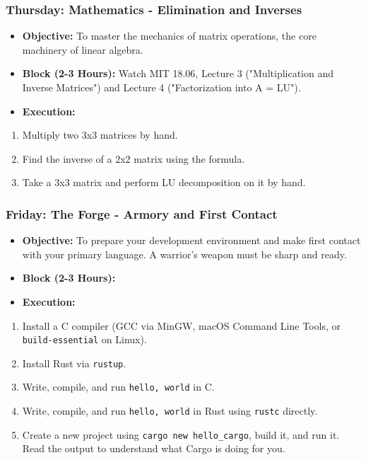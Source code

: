 \documentclass[11pt,a4paper]{report}
\begin{document}
\subsubsection{\textbf{Thursday: Mathematics - Elimination and Inverses}}
\begin{itemize}
  \item \textbf{Objective:} To master the mechanics of matrix operations, the core machinery of linear algebra.
  \item \textbf{Block (2-3 Hours):} Watch MIT 18.06, Lecture 3 ("Multiplication and Inverse Matrices") and Lecture 4 ("Factorization into A = LU").
  \item \textbf{Execution:}
\end{itemize}
\begin{enumerate}
  \item Multiply two 3x3 matrices by hand.
  \item Find the inverse of a 2x2 matrix using the formula.
  \item Take a 3x3 matrix and perform LU decomposition on it by hand.

\end{enumerate}
\subsubsection{\textbf{Friday: The Forge - Armory and First Contact}}
\begin{itemize}
  \item \textbf{Objective:} To prepare your development environment and make first contact with your primary language. A warrior's weapon must be sharp and ready.
  \item \textbf{Block (2-3 Hours):}
  \item \textbf{Execution:}
\end{itemize}
\begin{enumerate}
  \item Install a C compiler (GCC via MinGW, macOS Command Line Tools, or \texttt{build-essential} on Linux).
  \item Install Rust via \texttt{rustup}.
  \item Write, compile, and run \texttt{hello, world} in C.
  \item Write, compile, and run \texttt{hello, world} in Rust using \texttt{rustc} directly.
  \item Create a new project using \texttt{cargo new hello\_cargo}, build it, and run it. Read the output to understand what Cargo is doing for you.

\end{enumerate}
\end{document}
